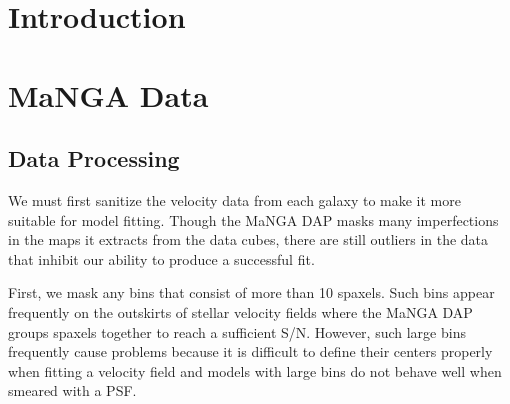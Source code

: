 

\section{Introduction}
\label{sec:intro}

\section{MaNGA Data}
\label{sec:data}


\subsection{Data Processing} \label{sec:clipping}

We must first sanitize the velocity data from each galaxy to make it more suitable for model fitting. Though the MaNGA DAP masks many imperfections in the maps it extracts from the data cubes, there are still outliers in the data that inhibit our ability to produce a successful fit. 

First, we mask any bins that consist of more than 10 spaxels. Such bins appear frequently on the outskirts of stellar velocity fields where the MaNGA DAP groups spaxels together to reach a sufficient S/N. However, such large bins frequently cause problems because it is difficult to define their centers properly when fitting a velocity field and models with large bins do not behave well when smeared with a PSF. 

